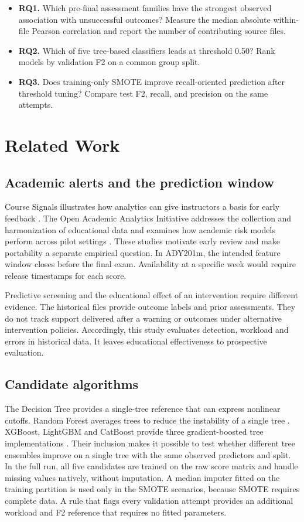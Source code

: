 \documentclass[runningheads]{llncs}
\begin{document}
\begin{itemize}
\item \textbf{RQ1.} Which pre-final assessment families have the strongest observed association with unsuccessful outcomes? Measure the median absolute within-file Pearson correlation and report the number of contributing source files.
\item \textbf{RQ2.} Which of five tree-based classifiers leads at threshold 0.50? Rank models by validation F2 on a common group split.
\item \textbf{RQ3.} Does training-only SMOTE improve recall-oriented prediction after threshold tuning? Compare test F2, recall, and precision on the same attempts.
\end{itemize}

\section{Related Work}
\subsection{Academic alerts and the prediction window}
Course Signals illustrates how analytics can give instructors a basis for early feedback \cite{arnold}. The Open Academic Analytics Initiative addresses the collection and harmonization of educational data and examines how academic risk models perform across pilot settings \cite{jaya}. These studies motivate early review and make portability a separate empirical question. In ADY201m, the intended feature window closes before the final exam. Availability at a specific week would require release timestamps for each score.

Predictive screening and the educational effect of an intervention require different evidence. The historical files provide outcome labels and prior assessments. They do not track support delivered after a warning or outcomes under alternative intervention policies. Accordingly, this study evaluates detection, workload and errors in historical data. It leaves educational effectiveness to prospective evaluation.

\subsection{Candidate algorithms}
The Decision Tree provides a single-tree reference that can express nonlinear cutoffs. Random Forest averages trees to reduce the instability of a single tree \cite{breiman}. XGBoost, LightGBM and CatBoost provide three gradient-boosted tree implementations \cite{chen,ke,cat}. Their inclusion makes it possible to test whether different tree ensembles improve on a single tree with the same observed predictors and split.
In the full run, all five candidates are trained on the raw score matrix and handle missing values natively, without imputation. A median imputer fitted on the training partition is used only in the SMOTE scenarios, because SMOTE requires complete data. A rule that flags every validation attempt provides an additional workload and F2 reference that requires no fitted parameters.
\end{document}
